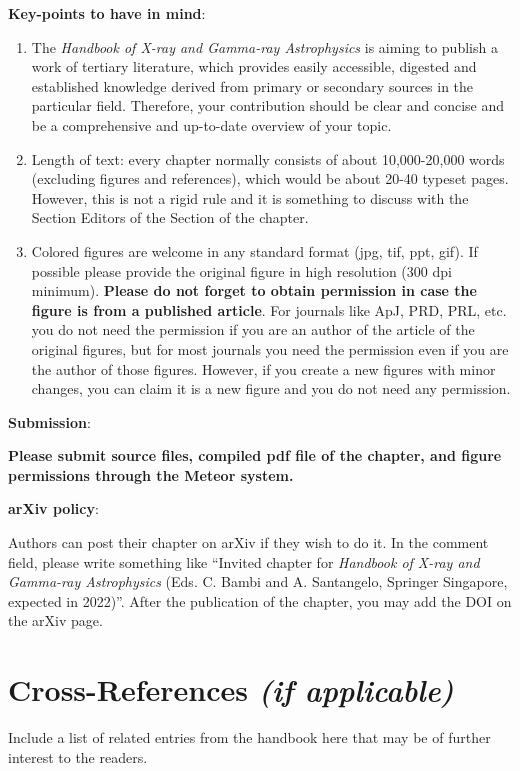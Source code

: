 \documentclass[graybox, nosecnum]{svmult}
\begin{document}
{\bf Key-points to have in mind}:
\begin{enumerate}
\item The {\it Handbook of X-ray and Gamma-ray Astrophysics} is aiming to publish a work of tertiary literature, which provides easily accessible, digested and established knowledge derived from primary or secondary sources in the particular field. Therefore, your contribution should be clear and concise and be a comprehensive and up-to-date overview of your topic.
\item Length of text: every chapter normally consists of about 10,000-20,000 words (excluding figures and references), which would be about 20-40 typeset pages. However, this is not a rigid rule and it is something to discuss with the Section Editors of the Section of the chapter.
\item Colored figures are welcome in any standard format (jpg, tif, ppt, gif). If possible please provide the original figure in high resolution (300 dpi minimum). {\color{red}\bf Please do not forget to obtain permission in case the figure is from a published article}. For journals like ApJ, PRD, PRL, etc. you do not need the permission if you are an author of the article of the original figures, but for most journals you need the permission even if you are the author of those figures. However, if you create a new figures with minor changes, you can claim it is a new figure and you do not need any permission.
\end{enumerate}


\vspace{0.5cm}

{\bf Submission}:

\vspace{0.1cm}

{\color{red} \bf Please submit source files, compiled pdf file of the chapter, and figure permissions through the Meteor system.}

\vspace{0.5cm}

{\bf arXiv policy}:

\vspace{0.1cm}

{Authors can post their chapter on arXiv if they wish to do it. In the comment field, please write something like ``Invited chapter for {\it Handbook of X-ray and Gamma-ray Astrophysics} (Eds. C. Bambi and A. Santangelo, Springer Singapore, expected in 2022)''. After the publication of the chapter, you may add the DOI on the arXiv page.}



\section{Cross-References \textit{(if applicable)}}
Include a list of related entries from the handbook here that may be of further interest to the readers.



\end{document}
